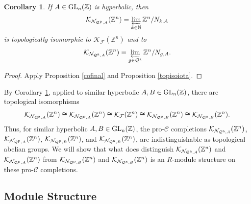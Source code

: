 \documentclass{amsart}
\theoremstyle{plain}
\newtheorem{corollary}[theorem]{Corollary}
\theoremstyle{definition}
\theoremstyle{remark}
\begin{document}
\begin{corollary}\label{GAisoZnbar} If $A\in {\rm GL}_n({\mathbb Z})$ is hyperbolic, then
\[ {\mathcal K}_{ {\mathcal N}_{ {\mathcal Q}^{\rm p},A} }({\mathbb Z}^n) =  \varprojlim_{ k\in {\mathbb N}} {\mathbb Z}^n/N_{k,A}\]
is topologically isomorphic to ${\mathcal K}_{\mathcal F}({\mathbb Z}^n)$ and to
\[ {\mathcal K}_{ {\mathcal N}_{ {\mathcal Q}^{\rm a},A}} ( {\mathbb Z}^n) = \varprojlim_{g\in {\mathcal Q}^{\rm a}} {\mathbb Z}^n/ N_{g,A}.\]
\end{corollary}

\begin{proof} Apply Proposition \ref{cofinal} and Proposition \ref{topisoiota}.
\end{proof}

By Corollary \ref{GAisoZnbar}, applied to similar hyperbolic $A,B\in {\rm GL}_n({\mathbb Z})$, there are topological isomorphisms 
\[ {\mathcal K}_{ {\mathcal N}_{ {\mathcal Q}^{\rm a},A}}({\mathbb Z}^n) \cong {\mathcal K}_{ {\mathcal N}_ { {\mathcal Q}^{\rm p},A}}({\mathbb Z}^n) \cong {\mathcal K}_{\mathcal F}({\mathbb Z}^n) \cong {\mathcal K}_{ {\mathcal N}_{ {\mathcal Q}^{\rm p}, B}}({\mathbb Z}^n) \cong {\mathcal K}_{ {\mathcal N}_{ {\mathcal Q}^{\rm a},B} }({\mathbb Z}^n).\]
Thus, for similar hyperbolic $A,B \in {\rm GL}_n({\mathbb Z})$, the pro-${\mathcal C}$ completions ${\mathcal K}_{ {\mathcal N}_{ {\mathcal Q}^{\rm a},A}}({\mathbb Z}^n)$, ${\mathcal K}_{ {\mathcal N}_{ {\mathcal Q}^{\rm p},A}}({\mathbb Z}^n)$, ${\mathcal K}_{ {\mathcal N}_{ {\mathcal Q}^{\rm p},B}}({\mathbb Z}^n)$, and ${\mathcal K}_{ {\mathcal N}_{ {\mathcal Q}^{\rm a},B}}({\mathbb Z}^n)$, are indistinguishable as topological abelian groups. We will show that what does distinguish ${\mathcal K}_{ {\mathcal N}_{ {\mathcal Q}^{\rm a},A}}({\mathbb Z}^n)$ and ${\mathcal K}_{ {\mathcal N}_{{\mathcal Q}^{\rm p},A}}({\mathbb Z}^n)$ from ${\mathcal K}_{ {\mathcal N}_{ {\mathcal Q}^{\rm p},B}}({\mathbb Z}^n)$ and ${\mathcal K}_{ {\mathcal N}_{ {\mathcal Q}^ {\rm a},B}}({\mathbb Z}^n)$ is an $R$-module structure on these pro-${\mathcal C}$ completions.



\subsection{Module Structure}\label{sec:Module}
\end{document}
